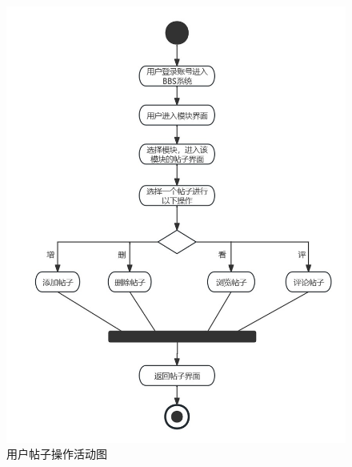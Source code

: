 \documentclass[UTF8]{ctexart}
\begin{document}
\begin{figure}[H]
  \centering
  \includegraphics[scale=0.25]{活动图/用户帖子操作活动图.jpg}
  \caption{用户帖子操作活动图}
\end{figure}
\end{document}
